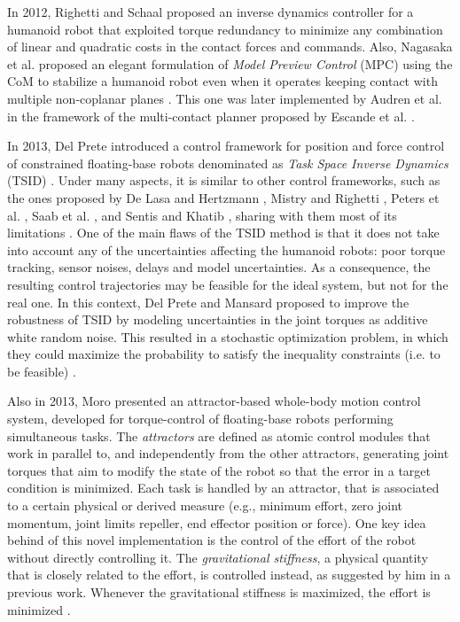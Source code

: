 	In 2012, Righetti and Schaal \cite{Righetti_Humanoids2012} proposed an inverse dynamics controller for
	a humanoid robot that exploited torque redundancy to minimize any combination of linear and quadratic
	costs in the contact forces and commands.
	Also, Nagasaka et al. \cite{Nagasaka_RobotSymp2012} proposed an elegant formulation of
	\emph{Model Preview Control} (MPC) using the CoM to stabilize a humanoid robot even when it
	operates keeping contact with multiple non-coplanar planes \cite{Audren_IROS2014}
	\cite{Nagasaka_RobotSymp2012}.
	This one was later implemented by Audren et al.	\cite{Audren_IROS2014} in the framework of 
	the multi-contact planner proposed by Escande et al. \cite{Escande_RobAutoSys2013}.
	
	In 2013, Del Prete \cite{DelPrete_PhDThesis2013} introduced a control framework for position and force
	control of constrained floating-base robots denominated as \emph{Task Space Inverse Dynamics}	(TSID)
	\cite{DelPrete_PhDThesis2013} \cite{DelPrete_RobAutoSys2015}.
	Under many aspects, it is similar to other control frameworks, such as the ones proposed by
	De Lasa and Hertzmann \cite{DeLasa_IROS2009}, Mistry and Righetti \cite{Mistry_RSS2011},
	Peters et al. \cite{Peters_AutoRobots2008}, Saab et al. \cite{Saab_ICRA2011}, and Sentis and Khatib
	\cite{Sentis_IJHR2005},	sharing with them most of its limitations \cite{DelPrete_PhDThesis2013}.
	One of the main flaws of the TSID method is that it does not take into account any of the uncertainties
	affecting the humanoid robots: poor torque tracking, sensor noises, delays and model uncertainties.
	As a consequence, the resulting control trajectories may be feasible for the ideal system,
	but not for	the real one.
	In this context, Del Prete and Mansard \cite{DelPrete_RSS2015} proposed to improve the robustness of
	TSID by modeling uncertainties in the joint torques as additive white random noise.
	This resulted in a stochastic optimization problem, in which they could maximize the probability
	to satisfy the inequality constraints (i.e. to be feasible) \cite{DelPrete_RSS2015}.
	
	Also in 2013, Moro \cite{Moro_Humanoids2013} \cite{Moro_IJHR2016} presented an attractor-based
	whole-body motion control	system, developed for	torque-control of floating-base robots performing
	simultaneous tasks.
	The \emph{attractors} are defined as atomic control modules that work in parallel to, and independently
	from the other attractors, generating joint torques that aim to modify the state of the robot so 
	that the error in a target condition is minimized.
	Each task is handled by an attractor, that is associated to a certain physical or derived measure
	(e.g., minimum effort, zero joint momentum, joint limits repeller, end effector position or force).
	One key idea behind of this novel implementation is the control of the effort of the robot without
	directly controlling it.
	The \emph{gravitational stiffness}, a physical quantity that is closely related to the effort,
	is controlled instead, as suggested by him \cite{Moro_Humanoids2015} in a previous work.
	Whenever the gravitational stiffness is maximized, the effort is minimized \cite{Moro_IJHR2016}.
	
